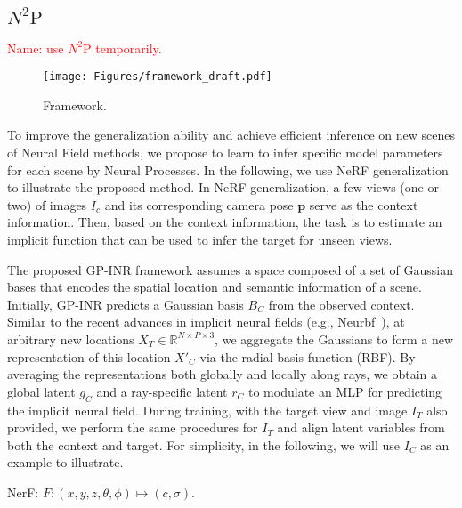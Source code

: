 

\subsection{$N^2\text{P}$}
\textcolor{red}{Name: use $N^2\text{P}$ temporarily.}

\begin{figure}[h]
  \centering
  \texttt{[image: Figures/framework\_draft.pdf]} %
  \caption{Framework.} %
  \label{fig:framework}
\end{figure}

To improve the generalization ability and achieve efficient inference on new scenes of Neural Field methods, we propose to learn to infer specific model parameters for each scene by Neural Processes.
In the following, we use NeRF generalization to illustrate the proposed method.  In NeRF generalization, a few views (one or two) of images $I_c$ and its corresponding camera pose $\mathbf{p}$ serve as the context information. 
Then, based on the context information, the task is to estimate an implicit function that can be used to infer the target for unseen views.

The proposed GP-INR framework assumes a space composed of a set of Gaussian bases that encodes the spatial location and semantic information of a scene. Initially, GP-INR predicts a Gaussian basis $B_C$ from the observed context. Similar to the recent advances in implicit neural fields (e.g., Neurbf~\cite{chen2023neurbf}), at arbitrary new locations $X_T \in \mathbb{R}^{N\times P\times 3}$, we aggregate the Gaussians to form a new representation of this location $X'_C$ via the radial basis function (RBF). By averaging the representations both globally and locally along rays, we obtain a global latent $g_C$ and a ray-specific latent $r_C$ to modulate an MLP for predicting the implicit neural field. During training, with the target view and image $I_T$ also provided, we perform the same procedures for $I_T$ and align latent variables from both the context and target. For simplicity, in the following, we will use $I_C$ as an example to illustrate. 

NerF: $F: (x,y,z,\theta,\phi) \mapsto (c,\sigma)$. 

